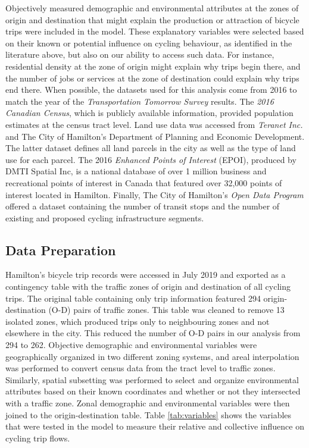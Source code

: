 \documentclass[smallextended]{svjour3}       %
\begin{document}
Objectively measured demographic and environmental attributes at the
zones of origin and destination that might explain the production or
attraction of bicycle trips were included in the model. These
explanatory variables were selected based on their known or potential
influence on cycling behaviour, as identified in the literature above,
but also on our ability to access such data. For instance, residential
density at the zone of origin might explain why trips begin there, and
the number of jobs or services at the zone of destination could explain
why trips end there. When possible, the datasets used for this analysis
come from 2016 to match the year of the \emph{Transportation Tomorrow
Survey} results. The \emph{2016 Canadian Census}, which is publicly
available information, provided population estimates at the census tract
level. Land use data was accessed from \emph{Teranet Inc.} and The City
of Hamilton's Department of Planning and Economic Development. The
latter dataset defines all land parcels in the city as well as the type
of land use for each parcel. The 2016 \emph{Enhanced Points of Interest}
(EPOI), produced by DMTI Spatial Inc, is a national database of over 1
million business and recreational points of interest in Canada that
featured over 32,000 points of interest located in Hamilton. Finally,
The City of Hamilton's \emph{Open Data Program} offered a dataset
containing the number of transit stops and the number of existing and
proposed cycling infrastructure segments.

\hypertarget{data-preparation}{%
\subsection{Data Preparation}\label{data-preparation}}

Hamilton's bicycle trip records were accessed in July 2019 and exported
as a contingency table with the traffic zones of origin and destination
of all cycling trips. The original table containing only trip
information featured 294 origin-destination (O-D) pairs of traffic
zones. This table was cleaned to remove 13 isolated zones, which
produced trips only to neighbouring zones and not elsewhere in the city.
This reduced the number of O-D pairs in our analysis from 294 to 262.
Objective demographic and environmental variables were geographically
organized in two different zoning systems, and areal interpolation was
performed to convert census data from the tract level to traffic zones.
Similarly, spatial subsetting was performed to select and organize
environmental attributes based on their known coordinates and whether or
not they intersected with a traffic zone. Zonal demographic and
environmental variables were then joined to the origin-destination
table. Table \ref{tab:variables} shows the variables that were tested in
the model to measure their relative and collective influence on cycling
trip flows.
\end{document}
